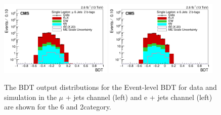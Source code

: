 \begin{figure}[ht!]
    \includegraphics[width=0.48\textwidth]{images/Run2/BDT_Mu29Aug400trees_5MinNodeSize_20nCuts_3MaxDepth_5adaboostbeta_adaBoost_alphaSTune_noMinEvents6nJets2nMtags_StackLogY.pdf}
    \includegraphics[width=0.48\textwidth]{images/Run2/BDT_El29Aug400trees_5MinNodeSize_20nCuts_3MaxDepth_5adaboostbeta_adaBoost_alphaSTune_noMinEvents6nJets2nMtags_StackLogY.pdf} 
    \caption{The BDT output distributions for the Event-level BDT for data and simulation in the $\mu$ + jets channel (left) and e + jets channel (left) are shown for the 6 \njets and 2\nMtags category.}
    \label{fig:BDT_Mu29Aug400trees_5MinNodeSize_20nCuts_3MaxDepth_5adaboostbeta_adaBoost_alphaSTune_noMinEvents62}
\end{figure}

